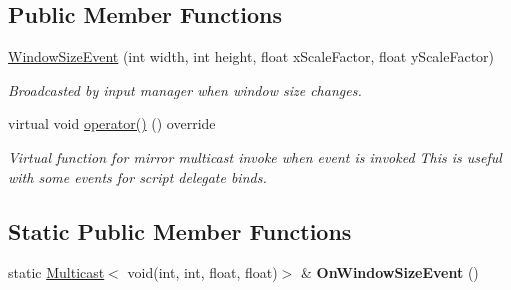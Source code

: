 \subsection*{Public Member Functions}
\begin{DoxyCompactItemize}
\item 
\hyperlink{classWindowSizeEvent_a45014eeeeaf398b8e05c516f801aafef}{Window\+Size\+Event} (int width, int height, float x\+Scale\+Factor, float y\+Scale\+Factor)
\begin{DoxyCompactList}\small\item\em Broadcasted by input manager when window size changes. \end{DoxyCompactList}\item 
\mbox{\label{classWindowSizeEvent_a84bfbde81a0870ab07c5adcdbc1ae8b4}} 
virtual void \hyperlink{classWindowSizeEvent_a84bfbde81a0870ab07c5adcdbc1ae8b4}{operator()} () override
\begin{DoxyCompactList}\small\item\em Virtual function for mirror multicast invoke when event is invoked This is useful with some events for script delegate binds. \end{DoxyCompactList}\end{DoxyCompactItemize}
\subsection*{Static Public Member Functions}
\begin{DoxyCompactItemize}
\item 
\mbox{\label{classWindowSizeEvent_a554ef19bd36b86f214ebfd2f9d987bf5}} 
static \hyperlink{classMulticast}{Multicast}$<$ void(int, int, float, float)$>$ \& {\bfseries On\+Window\+Size\+Event} ()
\end{DoxyCompactItemize}
